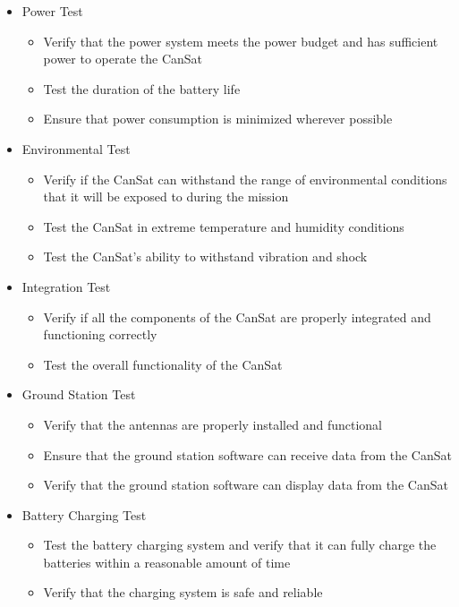 \documentclass[11pt]{article}
\begin{document}
\begin{itemize}[leftmargin=1cm, itemindent=0.25cm, noitemsep, topsep=0pt, label=]
\item Power Test
\begin{itemize}[label=, noitemsep, topsep=2pt]
\item Verify that the power system meets the power budget and has sufficient power to operate the CanSat
\item Test the duration of the battery life
\item Ensure that power consumption is minimized wherever possible
\end{itemize}

\item Environmental Test
\begin{itemize}[label=, noitemsep, topsep=2pt]
\item Verify if the CanSat can withstand the range of environmental conditions that it will be exposed to during the mission
\item Test the CanSat in extreme temperature and humidity conditions
\item Test the CanSat's ability to withstand vibration and shock
\end{itemize}

\item Integration Test
\begin{itemize}[label=, noitemsep, topsep=2pt]
\item Verify if all the components of the CanSat are properly integrated and functioning correctly
\item Test the overall functionality of the CanSat
\end{itemize}

\item Ground Station Test
\begin{itemize}[label=, noitemsep, topsep=2pt]
\item Verify that the antennas are properly installed and functional
\item Ensure that the ground station software can receive data from the CanSat
\item Verify that the ground station software can display data from the CanSat
\end{itemize}

\item Battery Charging Test
\begin{itemize}[label=, noitemsep, topsep=2pt]
\item Test the battery charging system and verify that it can fully charge the batteries within a reasonable amount of time
\item Verify that the charging system is safe and reliable
\end{itemize}


\end{itemize}
\end{document}
